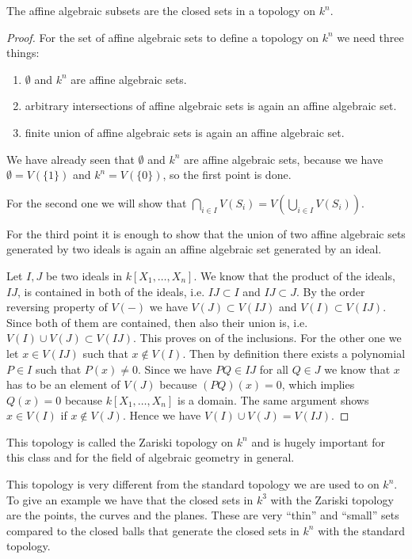 \begin{proposition}
The affine algebraic subsets are the closed sets in a topology on $k^n$. 
\end{proposition}

\begin{proof}
For the set of affine algebraic sets to define a topology on $k^n$ we need three things:
\begin{enumerate}
    \item $\emptyset$ and $k^n$ are affine algebraic sets.
    \item arbitrary intersections of affine algebraic sets is again an affine algebraic set.
    \item finite union of affine algebraic sets is again an affine algebraic set. 
\end{enumerate}

We have already seen that $\emptyset$ and $k^n$ are affine algebraic sets, because we have $\emptyset = V(\{ 1\})$ and $k^n=V(\{0\})$, so the first point is done. 

For the second one we will show that $ \bigcap_{i\in I}V(S_i) = V(\bigcup_{i\in I}V(S_i))$. 

For the third point it is enough to show that the union of two affine algebraic sets generated by two ideals is again an affine algebraic set generated by an ideal.

Let $I, J$ be two ideals in $k[X_1, \ldots, X_n]$. We know that the product of the ideals, $IJ$, is contained in both of the ideals, i.e. $IJ\subset I$ and $IJ\subset J$. By the order reversing property of $V(-)$ we have $V(J)\subset V(IJ)$ and $V(I)\subset V(IJ)$. Since both of them are contained, then also their union is, i.e. $V(I)\cup V(J) \subset V(IJ)$. This proves on of the inclusions. For the other one we let $x\in V(IJ)$ such that $x\notin V(I)$. Then by definition there exists a polynomial $P\in I$ such that $P(x)\neq 0$. Since we have $PQ\in IJ$ for all $Q\in J$ we know that $x$ has to be an element of $V(J)$ because $(PQ)(x)=0$, which implies $Q(x)=0$ because $k[X_1, \ldots, X_n]$ is a domain. The same argument shows $x\in V(I)$ if $x\notin V(J)$. Hence we have $V(I)\cup V(J) = V(IJ)$. 
\end{proof}

This topology is called the Zariski topology on $k^n$ and is hugely important for this class and for the field of algebraic geometry in general. 

This topology is very different from the standard topology we are used to on $k^n$. To give an example we have that the closed sets in $k^3$ with the Zariski topology are the points, the curves and the planes. These are very ``thin'' and ``small'' sets compared to the closed balls that generate the closed sets in $k^n$ with the standard topology. 

